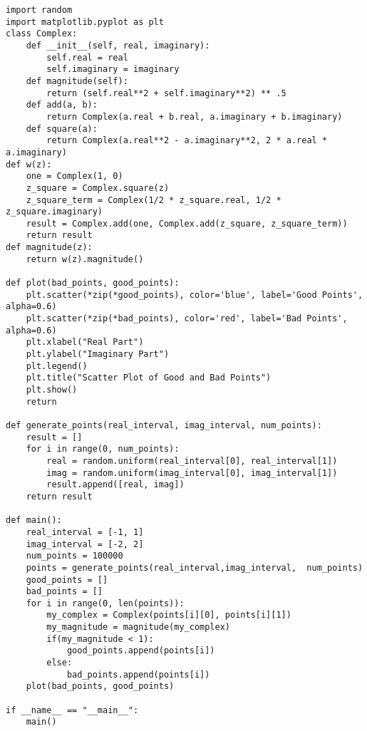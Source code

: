 \documentclass{article}
\begin{document}
\begin{lstlisting}
import random
import matplotlib.pyplot as plt
class Complex:
    def __init__(self, real, imaginary):
        self.real = real
        self.imaginary = imaginary
    def magnitude(self):
        return (self.real**2 + self.imaginary**2) ** .5
    def add(a, b):
        return Complex(a.real + b.real, a.imaginary + b.imaginary)
    def square(a):
        return Complex(a.real**2 - a.imaginary**2, 2 * a.real * a.imaginary)
def w(z):
    one = Complex(1, 0)
    z_square = Complex.square(z)
    z_square_term = Complex(1/2 * z_square.real, 1/2 * z_square.imaginary)
    result = Complex.add(one, Complex.add(z_square, z_square_term))
    return result
def magnitude(z):
    return w(z).magnitude()

def plot(bad_points, good_points):
    plt.scatter(*zip(*good_points), color='blue', label='Good Points', alpha=0.6)
    plt.scatter(*zip(*bad_points), color='red', label='Bad Points', alpha=0.6)
    plt.xlabel("Real Part")
    plt.ylabel("Imaginary Part")
    plt.legend()
    plt.title("Scatter Plot of Good and Bad Points")
    plt.show()
    return

def generate_points(real_interval, imag_interval, num_points):
    result = []
    for i in range(0, num_points):
        real = random.uniform(real_interval[0], real_interval[1])
        imag = random.uniform(imag_interval[0], imag_interval[1])
        result.append([real, imag])
    return result

def main():
    real_interval = [-1, 1]
    imag_interval = [-2, 2]
    num_points = 100000
    points = generate_points(real_interval,imag_interval,  num_points)
    good_points = []
    bad_points = []
    for i in range(0, len(points)):
        my_complex = Complex(points[i][0], points[i][1])
        my_magnitude = magnitude(my_complex)
        if(my_magnitude < 1):
            good_points.append(points[i])
        else:
            bad_points.append(points[i])
    plot(bad_points, good_points)

if __name__ == "__main__":
    main()
\end{lstlisting}
\end{document}
